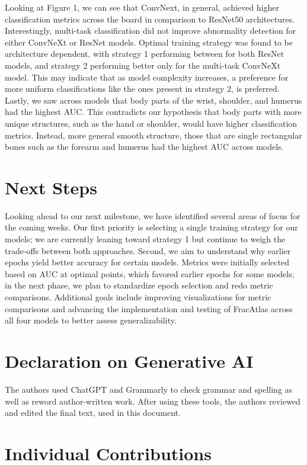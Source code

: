 \documentclass[conference]{IEEEtran}
\begin{document}
Looking at Figure 1, we can see that ConvNext, in general, achieved higher classification metrics across the board in comparison to ResNet50 architectures. Interestingly, multi-task classification did not improve abnormality detection for either ConvNeXt or ResNet models. Optimal training strategy was found to be architecture dependent, with strategy 1 performing between for both ResNet models, and strategy 2 performing better only for the multi-task ConvNeXt model. This may indicate that as model complexity increases, a preference for more uniform classifications like the ones present in strategy 2, is preferred. Lastly, we saw across models that body parts of the wrist, shoulder, and humerus had the highest AUC. This contradicts our hypothesis that body parts with more unique structures, such as the hand or shoulder, would have higher classification metrics. Instead, more general smooth structure, those that are single rectangular bones such as the forearm and humerus had the highest AUC across models. 

\section{Next Steps}
Looking ahead to our next milestone, we have identified several areas of focus for the coming weeks. Our first priority is selecting a single training strategy for our models; we are currently leaning toward strategy 1 but continue to weigh the trade-offs between both approaches. Second, we aim to understand why earlier epochs yield better accuracy for certain models. Metrics were initially selected based on AUC at optimal points, which favored earlier epochs for some models; in the next phase, we plan to standardize epoch selection and redo metric comparisons. Additional goals include improving visualizations for metric comparisons and advancing the implementation and testing of FracAtlas across all four models to better assess generalizability. 


\section{Declaration on Generative AI}
The authors used ChatGPT and Grammarly to check grammar and spelling as well as reword author-written work. After using these tools, the authors reviewed and edited the final text, used in this document. 

\section{Individual Contributions}
\end{document}
